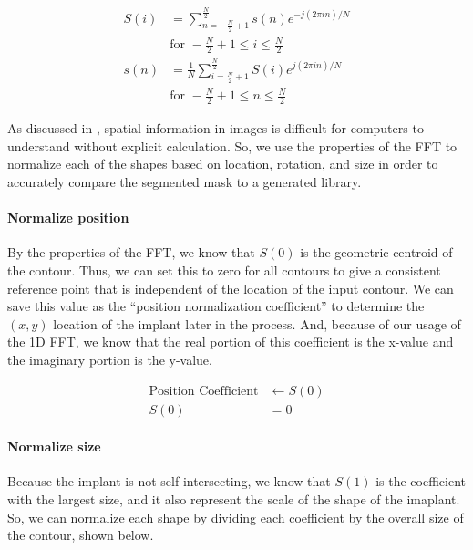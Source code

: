 \begin{equation}
    \begin{aligned}
        S(i) &= \sum_{n = -\frac{N}{2} + 1}^{\frac{N}{2}} s(n)e^{-j(2\pi i n)/N} \\
        &\text{for } -\frac{N}{2} + 1 \le i \le \frac{N}{2} \\
        s(n) &= \frac{1}{N} \sum_{i = \frac{N}{2} + 1}^{\frac{N}{2}} S(i)e^{j(2\pi i n )/N}\\
        &\text{for } -\frac{N}{2} + 1 \le n \le \frac{N}{2}
    \end{aligned}
    \label{eq:fft}
\end{equation}

As discussed in , spatial information in images is difficult for computers to understand without explicit calculation. So, we use the properties of the FFT to normalize each of the shapes based on location, rotation, and size in order to accurately compare the segmented mask to a generated library.

\paragraph*{Normalize position}
By the properties of the FFT, we know that $S(0)$ is the geometric centroid of the contour. Thus, we can set this to zero for all contours to give a consistent reference point that is independent of the location of the input contour. We can save this value as the ``position normalization coefficient'' to determine the $(x,y)$ location of the implant later in the process. And, because of our usage of the 1D FFT, we know that the real portion of this coefficient is the x-value and the imaginary portion is the y-value.

\begin{equation}
    \begin{aligned}
        \text{Position Coefficient} &\leftarrow S(0) \\
        S(0) &= 0
    \end{aligned}
\end{equation}

\paragraph*{Normalize size}
Because the implant is not self-intersecting, we know that $S(1)$ is the coefficient with the largest size, and it also represent the scale of the shape of the imaplant. So, we can normalize each shape by dividing each coefficient by the overall size of the contour, shown below.

